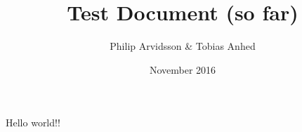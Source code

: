 \documentclass{article}
\title{Test Document (so far)}
\author{Philip Arvidsson \& Tobias Anhed}
\date{November 2016}
\begin{document}
    \maketitle
    Hello world!!
\end{document}
